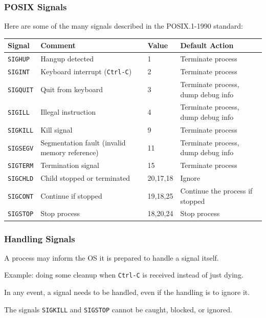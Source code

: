 \begin{frame}
\frametitle{POSIX Signals}

Here are some of the many signals described in the POSIX.1-1990 standard:

{\scriptsize
\begin{center}
\begin{tabular}{l|l|l|l}
	\textbf{Signal} & \textbf{Comment} & \textbf{Value} & \textbf{Default Action}\\ \hline
	\texttt{SIGHUP} & Hangup detected & 1 & Terminate process \\
	\texttt{SIGINT} & Keyboard interrupt (\texttt{Ctrl-C}) & 2 & Terminate process \\
	\texttt{SIGQUIT} & Quit from keyboard & 3 & Terminate process, dump debug info  \\
	\texttt{SIGILL} & Illegal instruction & 4 & Terminate process, dump debug info \\
	\texttt{SIGKILL} & Kill signal & 9 & Terminate process \\
	\texttt{SIGSEGV} & Segmentation fault (invalid memory reference) & 11 & Terminate process, dump debug info\\
	\texttt{SIGTERM} & Termination signal & 15 & Terminate process \\
	\texttt{SIGCHLD} & Child stopped or terminated & 20,17,18 & Ignore \\
	\texttt{SIGCONT} & Continue if stopped & 19,18,25 & Continue the process if stopped \\
	\texttt{SIGSTOP} & Stop process & 18,20,24 & Stop process \\
\end{tabular}
\end{center}
}

\end{frame}


\begin{frame}
\frametitle{Handling Signals}

A process may inform the OS it is prepared to handle a signal itself.

Example: doing some cleanup when \texttt{Ctrl-C} is received instead of just dying.

In any event, a signal needs to be handled, even if the handling is to ignore it. 

The signals \texttt{SIGKILL} and \texttt{SIGSTOP} cannot be caught, blocked, or ignored.


\end{frame}



